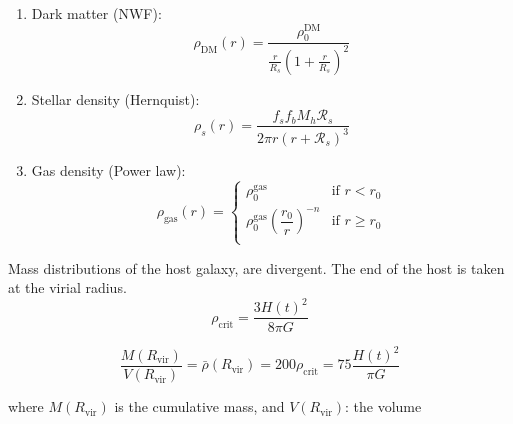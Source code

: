 \documentclass{beamer}
\newcommand{\sm}[0]{$M_\odot$}
\begin{document}
\begin{frame}
	\begin{enumerate}
		\item Dark matter (NWF):
		\begin{equation}\label{eq: dmdensity}
		\rho_\text{DM}(r) = \dfrac{\rho_0^\text{DM}}{\frac{r}{R_s}\left(1 + \frac{r}{R_s}\right)^2}
		\end{equation}
		\item Stellar density (Hernquist):
		\begin{equation}
		\rho_s(r) = \dfrac{f_sf_bM_h \mathcal{R}_s}{2\pi r(r + \mathcal{R}_s)^3}
		\end{equation}
		\item Gas density (Power law):
		\begin{equation}
		\rho_\text{gas}(r) = \left \{
		\begin{matrix}
		\rho_0^\text{gas} & \text{if $r < r_0$}\\
		\rho_0^\text{gas}\left(\dfrac{r_0}{r}\right)^{-n} & \text{if $r \geq r_0$}\\
		\end{matrix}
		\right.
		\end{equation}
	\end{enumerate}
\end{frame}

\begin{frame}
	Mass distributions of the host galaxy, are divergent. The end of the host is taken at the virial radius.
	\begin{equation}\label{eq: critical_density}
	\rho_\text{crit} = \dfrac{3H(t)^2}{8\pi G}
	\end{equation}
	
	\begin{equation}\label{eq: R_vir_def}
	\dfrac{M(R_\text{vir})}{V(R_\text{vir})} = \bar{\rho}(R_\text{vir}) =  200 \rho_\text{crit} = 75\dfrac{H(t)^2}{\pi G}
	\end{equation}
	
	where $M(R_\text{vir})$ is the cumulative mass, and $V(R_\text{vir})$: the volume
\end{frame}

%	
\end{document}
